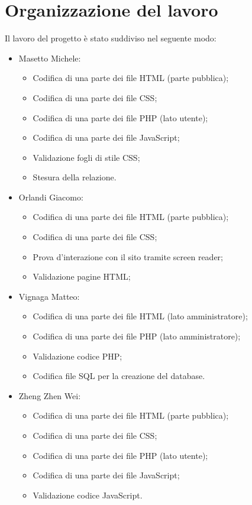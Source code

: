 \section{Organizzazione del lavoro}

Il lavoro del progetto è stato suddiviso nel seguente modo:
\begin{itemize}
	\item Masetto Michele:
	\begin{itemize}
		\item Codifica di una parte dei file HTML (parte pubblica);
		\item Codifica di una parte dei file CSS;
		\item Codifica di una parte dei file PHP (lato utente);
		\item Codifica di una parte dei file JavaScript;
		\item Validazione fogli di stile CSS;
		\item Stesura della relazione.
	\end{itemize}
	\item Orlandi Giacomo:
		\begin{itemize}
			\item Codifica di una parte dei file HTML (parte pubblica);
			\item Codifica di una parte dei file CSS;
			\item Prova d'interazione con il sito tramite screen reader;
			\item Validazione pagine HTML;
		\end{itemize}
	\item Vignaga Matteo:
		\begin{itemize}
			\item Codifica di una parte dei file HTML (lato amministratore);
			\item Codifica di una parte dei file PHP (lato amministratore);
			\item Validazione codice PHP;
			\item Codifica file SQL per la creazione del database.
		\end{itemize}
	\item Zheng Zhen Wei:
		\begin{itemize}
			\item Codifica di una parte dei file HTML (parte pubblica);
			\item Codifica di una parte dei file CSS;
			\item Codifica di una parte dei file PHP (lato utente);
			\item Codifica di una parte dei file JavaScript;
			\item Validazione codice JavaScript.
		\end{itemize}
\end{itemize}